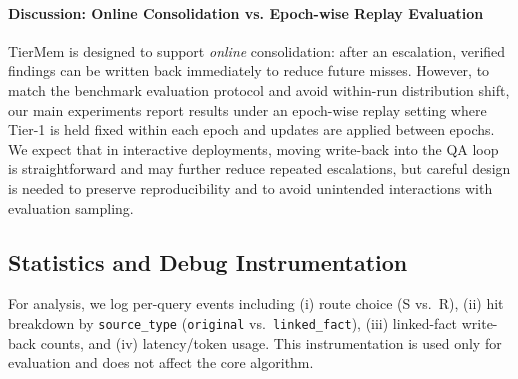 \documentclass{article}
\theoremstyle{plain}
\theoremstyle{definition}
\theoremstyle{remark}
\begin{document}
\paragraph{Discussion: Online Consolidation vs. Epoch-wise Replay Evaluation}

TierMem is designed to support \emph{online} consolidation: after an escalation, verified findings can be written back immediately to reduce future misses.
However, to match the benchmark evaluation protocol and avoid within-run distribution shift, our main experiments report results under an epoch-wise replay setting where Tier-1 is held fixed within each epoch and updates are applied between epochs.
We expect that in interactive deployments, moving write-back into the QA loop is straightforward and may further reduce repeated escalations, but careful design is needed to preserve reproducibility and to avoid unintended interactions with evaluation sampling.

\subsection{Statistics and Debug Instrumentation}
\label{app:stats}
For analysis, we log per-query events including (i) route choice (S vs.\ R), (ii) hit breakdown by \texttt{source\_type} (\texttt{original} vs.\ \texttt{linked\_fact}), (iii) linked-fact write-back counts, and (iv) latency/token usage. This instrumentation is used only for evaluation and does not affect the core algorithm.
\end{document}

